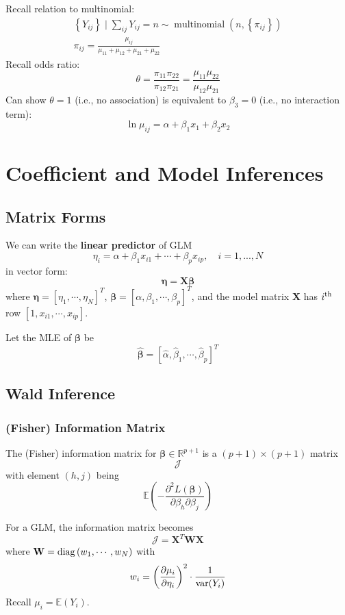 \documentclass[11pt]{elegantbook}
\begin{document}
Recall relation to multinomial:
$$
\begin{gathered}
\left\{Y_{i j}\right\} \mid \sum_{i j} Y_{i j}=n \sim \operatorname{multinomial}\left(n,\left\{\pi_{i j}\right\}\right) \\
\pi_{i j}=\frac{\mu_{i j}}{\mu_{11}+\mu_{12}+\mu_{21}+\mu_{22}}
\end{gathered}
$$
Recall odds ratio:
$$
\theta=\frac{\pi_{11} \pi_{22}}{\pi_{12} \pi_{21}}=\frac{\mu_{11} \mu_{22}}{\mu_{12} \mu_{21}}
$$
Can show $\theta=1$ (i.e., no association) is equivalent to $\beta_3=0$ (i.e., no interaction term):
$$
\ln \mu_{i j}=\alpha+\beta_1 x_1+\beta_2 x_2
$$


\section{Coefficient and Model Inferences}
\subsection*{Matrix Forms}
We can write the \textbf{linear predictor} of GLM
$$\eta_i = \alpha+\beta_1 x_{i1}+\cdots +\beta_p x_{ip},\quad i=1,...,N$$
in vector form: $$\boldsymbol{\eta}=\mathbf{X}\boldsymbol{\beta}$$
where $\boldsymbol{\eta}=\left[\eta_1,\cdots,\eta_N\right]^T$, $\boldsymbol{\beta}=\left[\alpha,\beta_1,\cdots, \beta_p\right]^T$, and the model matrix $\mathbf{X}$ has $i^\textnormal{th}$ row $[1,x_{i1},\cdots,x_{ip}]$.

Let the MLE of $\boldsymbol{\beta}$ be $$\hat{\boldsymbol{\beta}}=\left[\hat{\alpha},\hat{\beta}_1,\cdots,\hat{\beta}_p \right]^T$$

\subsection{Wald Inference}
\subsubsection{(Fisher) Information Matrix}
\begin{definition}
    \normalfont
    The (Fisher) information matrix for $\boldsymbol{\beta}\in \mathbb{R}^{p+1}$ is a $(p+1)\times(p+1)$ matrix $$\boldsymbol{\mathcal{J}}$$ with element $(h,j)$ being $$\mathbb{E}\left(-\frac{\partial^2 L(\boldsymbol{\beta})}{\partial \beta_h \partial \beta_j}\right)$$
\end{definition}
For a GLM, the information matrix becomes $$\boldsymbol{\mathcal{J}}=\mathbf{X}^T \mathbf{W} \mathbf{X}$$
where $\mathbf{W}=\textnormal{diag}\left(w_1,\cdots,w_N\right)$ with $$w_i=\left(\frac{\partial \mu_i}{\partial \eta_i}\right)^2\cdot \frac{1}{\textnormal{var}(Y_i)}$$
Recall $\mu_i=\mathbb{E}(Y_i)$.
\end{document}
